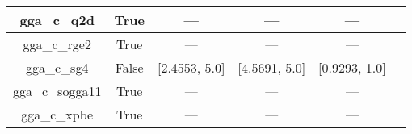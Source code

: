 \begin{tabular}{|c|c|c|c|c|l|}
     gga\_c\_q2d &                  True &              --- &           --- &            --- &                              \cite{Chiodo2012_126402} \\ \hline
    gga\_c\_rge2 &                  True &              --- &           --- &            --- &                             \cite{Ruzsinszky2009_763} \\ \hline
     gga\_c\_sg4 &                 False &    [2.4553, 5.0] & [4.5691, 5.0] &  [0.9293, 1.0] &                          \cite{Constantin2016_045126} \\ \hline
 gga\_c\_sogga11 &                  True &              --- &           --- &            --- &                              \cite{Peverati2011_1991} \\ \hline
    gga\_c\_xpbe &                  True &              --- &           --- &            --- &                                    \cite{Xu2004_4068} \\ \hline
\end{tabular}